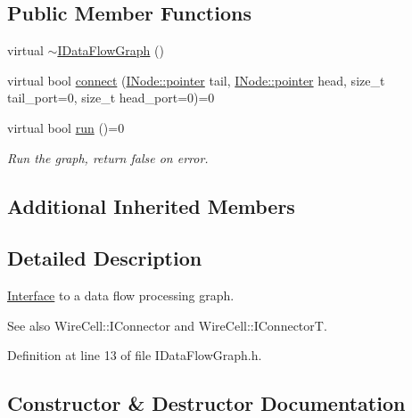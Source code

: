 \subsection*{Public Member Functions}
\begin{DoxyCompactItemize}
\item 
virtual \hyperlink{class_wire_cell_1_1_i_data_flow_graph_ac26c16e3b22069308bfa47eeb1127560}{$\sim$\+I\+Data\+Flow\+Graph} ()
\item 
virtual bool \hyperlink{class_wire_cell_1_1_i_data_flow_graph_a6d065b2f080d956a17e7da4356aa31d9}{connect} (\hyperlink{class_wire_cell_1_1_interface_a09c548fb8266cfa39afb2e74a4615c37}{I\+Node\+::pointer} tail, \hyperlink{class_wire_cell_1_1_interface_a09c548fb8266cfa39afb2e74a4615c37}{I\+Node\+::pointer} head, size\+\_\+t tail\+\_\+port=0, size\+\_\+t head\+\_\+port=0)=0
\item 
virtual bool \hyperlink{class_wire_cell_1_1_i_data_flow_graph_ab741ef1a0f772cb278dd2f111b54867e}{run} ()=0
\begin{DoxyCompactList}\small\item\em Run the graph, return false on error. \end{DoxyCompactList}\end{DoxyCompactItemize}
\subsection*{Additional Inherited Members}


\subsection{Detailed Description}
\hyperlink{class_wire_cell_1_1_interface}{Interface} to a data flow processing graph.

See also Wire\+Cell\+::\+I\+Connector and Wire\+Cell\+::\+I\+ConnectorT. 

Definition at line 13 of file I\+Data\+Flow\+Graph.\+h.



\subsection{Constructor \& Destructor Documentation}
\mbox{\label{class_wire_cell_1_1_i_data_flow_graph_ac26c16e3b22069308bfa47eeb1127560}} 
